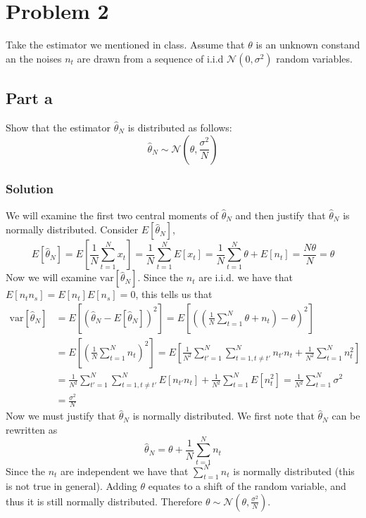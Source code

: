 \documentclass[a4paper]{article}
\begin{document}
\section*{Problem 2}%
Take the estimator we mentioned in class. Assume that $\theta$ is an unknown constand an the noises $n_t$ are drawn from a sequence of i.i.d $\mathcal{N}(0, \sigma^2)$ random variables.

\subsection*{Part a}%
Show that the estimator $\hat{\theta}_N$ is distributed as follows:
\[
  \hat{\theta}_N \sim \mathcal{N}\left(\theta, \frac{\sigma^2}{N}\right)
\]

\subsubsection*{Solution}%
We will examine the first two central moments of $\hat{\theta}_N$ and then justify that $\hat{\theta}_N$ is normally distributed. Consider $E[\hat{\theta}_N]$,
\[
  E[\hat{\theta}_N] = E \left[ \frac{1}{N} \sum_{t=1}^N x_t \right] = \frac{1}{N} \sum_{t=1}^N E \left[ x_t\right] = \frac{1}{N} \sum_{t=1}^N \theta + E[n_t] = \frac{N\theta}{N} = \theta
\]
Now we will examine $\text{var}[\hat{\theta}_N]$. Since the $n_t$ are i.i.d. we have that $E[n_tn_s] = E[n_t]E[n_s] = 0$, this tells us that 
\[
  \begin{aligned}
    \text{var}[\hat{\theta}_N] &= E \left[ \left( \hat{\theta}_N - E[\hat{\theta}_N] \right)^2 \right]  = E \left[ \left( \left( \frac{1}{N} \sum_{t=1}^N \theta + n_t \right) - \theta \right)^2 \right]\\
                               &= E \left[ \left( \frac{1}{N} \sum_{t=1}^N n_t \right)^2 \right] = E \left[ \frac{1}{N^2} \sum_{t'=1}^N\sum_{t = 1, t \neq t'}^{N} n_{t'}n_t + \frac{1}{N^2}\sum_{t=1}^N n_t^2 \right] \\
                               &= \frac{1}{N^2}\sum_{t'=1}^N\sum_{t = 1, t \neq t'}^{N} E\left[ n_{t'}n_{t}\right] + \frac{1}{N^2} \sum_{t=1}^N E \left[ n_t^2 \right] = \frac{1}{N^2} \sum_{t=1}^N \sigma^2\\
                               &= \frac{\sigma^2}{N}
  \end{aligned}
\]
Now we must justify that $\hat{\theta}_N$ is normally distributed. We first note that $\hat{\theta}_N$ can be rewritten as 
\[
  \hat{\theta}_N = \theta + \frac{1}{N}\sum_{t=1}^N n_t
\]
Since the $n_t$ are independent we have that $\sum_{t=1}^N n_t$ is normally distributed (this is not true in general). Adding $\theta$ equates to a shift of the random variable, and thus it is still normally distributed. Therefore $\theta \sim \mathcal{N}\left( \theta, \frac{\sigma^2}{N} \right).$
\end{document}
